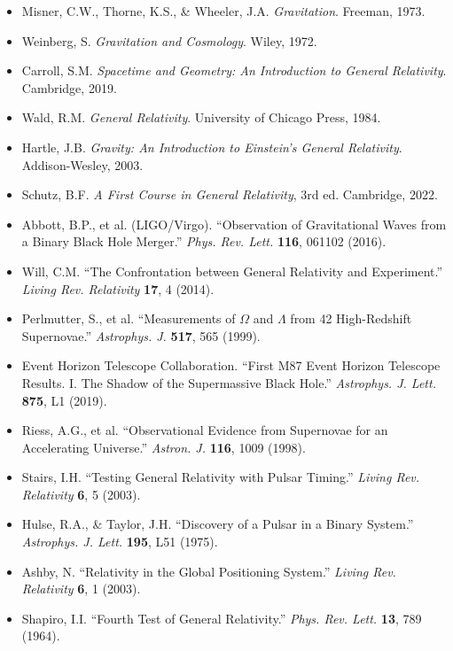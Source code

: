 \documentclass[a4paper, 11pt]{article}
\begin{document}
\begin{itemize}
\item Misner, C.W., Thorne, K.S., \& Wheeler, J.A. \textit{Gravitation}. Freeman, 1973.
\item Weinberg, S. \textit{Gravitation and Cosmology}. Wiley, 1972.
\item Carroll, S.M. \textit{Spacetime and Geometry: An Introduction to General Relativity}. Cambridge, 2019.
\item Wald, R.M. \textit{General Relativity}. University of Chicago Press, 1984.
\item Hartle, J.B. \textit{Gravity: An Introduction to Einstein's General Relativity}. Addison-Wesley, 2003.
\item Schutz, B.F. \textit{A First Course in General Relativity}, 3rd ed. Cambridge, 2022.
\item Abbott, B.P., et al. (LIGO/Virgo). ``Observation of Gravitational Waves from a Binary Black Hole Merger.'' \textit{Phys. Rev. Lett.} \textbf{116}, 061102 (2016).
\item Will, C.M. ``The Confrontation between General Relativity and Experiment.'' \textit{Living Rev. Relativity} \textbf{17}, 4 (2014).
\item Perlmutter, S., et al. ``Measurements of $\Omega$ and $\Lambda$ from 42 High-Redshift Supernovae.'' \textit{Astrophys. J.} \textbf{517}, 565 (1999).
\item Event Horizon Telescope Collaboration. ``First M87 Event Horizon Telescope Results. I. The Shadow of the Supermassive Black Hole.'' \textit{Astrophys. J. Lett.} \textbf{875}, L1 (2019).
\item Riess, A.G., et al. ``Observational Evidence from Supernovae for an Accelerating Universe.'' \textit{Astron. J.} \textbf{116}, 1009 (1998).
\item Stairs, I.H. ``Testing General Relativity with Pulsar Timing.'' \textit{Living Rev. Relativity} \textbf{6}, 5 (2003).
\item Hulse, R.A., \& Taylor, J.H. ``Discovery of a Pulsar in a Binary System.'' \textit{Astrophys. J. Lett.} \textbf{195}, L51 (1975).
\item Ashby, N. ``Relativity in the Global Positioning System.'' \textit{Living Rev. Relativity} \textbf{6}, 1 (2003).
\item Shapiro, I.I. ``Fourth Test of General Relativity.'' \textit{Phys. Rev. Lett.} \textbf{13}, 789 (1964).
\end{itemize}
\end{document}
